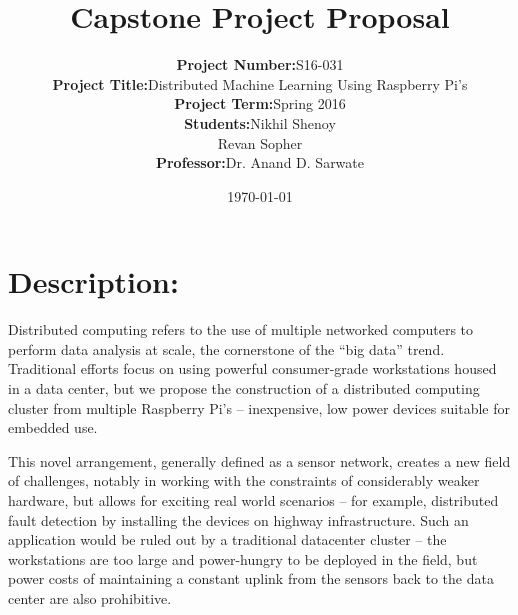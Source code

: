 \documentclass[12pt]{report}
\begin{document}
\title{Capstone Project Proposal}

\author{\begin{tabular}{rl}
	\textbf{Project Number:} & S16-031 \\
	\textbf{Project Title:} & Distributed Machine Learning Using Raspberry Pi’s \\
	\textbf{Project Term:} & Spring 2016 \\
	\textbf{Students:} & Nikhil Shenoy \\ & Revan Sopher \\
	\textbf{Professor:} & Dr. Anand D. Sarwate \\
\end{tabular}}

\date{\today}
\maketitle

\newpage

\section*{Description:}

Distributed computing refers to the use of multiple networked computers to perform data analysis at scale, the cornerstone of the “big data” trend. Traditional efforts focus on using powerful consumer-grade workstations housed in a data center, but we propose the construction of a distributed computing cluster from multiple Raspberry Pi’s -- inexpensive, low power devices suitable for embedded use.

This novel arrangement, generally defined as a sensor network, creates a new field of challenges, notably in working with the constraints of considerably weaker hardware, but allows for exciting real world scenarios -- for example, distributed fault detection by installing the devices on highway infrastructure. Such an application would be ruled out by a traditional datacenter cluster -- the workstations are too large and power-hungry to be deployed in the field, but power costs of maintaining a constant uplink from the sensors back to the data center are also prohibitive.
\end{document}
